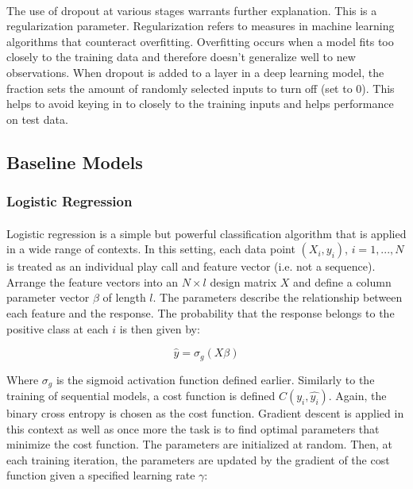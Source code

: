 \documentclass[11pt]{article}
\begin{document}
                    \begin{multicols*}{2}

                    \paragraph{}
                        The use of dropout at various stages warrants further explanation. 
                        This is a regularization parameter. 
                        Regularization refers to measures in machine learning algorithms that counteract overfitting.
                        Overfitting occurs when a model fits too closely to the training data and therefore doesn't generalize well to new observations.
                        When dropout is added to a layer in a deep learning model, the fraction sets the amount of randomly selected inputs to turn off (set to 0). 
                        This helps to avoid keying in to closely to the training inputs and helps performance on test data. 

        \subsection{Baseline Models}

            \subsubsection*{Logistic Regression}
                \paragraph{}
                    Logistic regression is a simple but powerful classification algorithm that is applied in a wide range of contexts.
                    In this setting, each data point $(X_i,y_i)$, $i = 1,...,N$ is treated as an individual play call and feature vector (i.e. not a sequence).
                    Arrange the feature vectors into an $N \times l$ design matrix $X$ and define a column parameter vector $\beta$ of length $l$.
                    The parameters describe the relationship between each feature and the response.
                    The probability that the response belongs to the positive class at each $i$ is then given by:
                    
                    $$\hat{y} = \sigma_g(X\beta)$$

                    Where $\sigma_g$ is the sigmoid activation function defined earlier. 
                    Similarly to the training of sequential models, a cost function is defined $C(y_i, \hat{y_i})$.
                    Again, the binary cross entropy is chosen as the cost function. 
                    Gradient descent is applied in this context as well as once more the task is to find optimal parameters that minimize the cost function.
                    The parameters are initialized at random.
                    Then, at each training iteration, the parameters are updated by the gradient of the cost function given a specified learning rate $\gamma$:


\end{multicols*}
\end{document}
